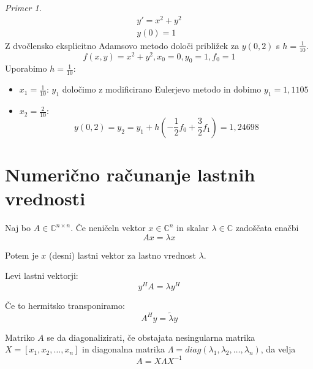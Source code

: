 \documentclass[a4paper,12pt]{article}
\theoremstyle{definition}
\theoremstyle{remark}
\newtheorem*{ex}{Primer}
\newcommand{\C}{\mathbb{C}}
\begin{document}
\begin{ex}
    \begin{gather*}
        y' = x^2 + y^2 \\
        y(0) = 1
    \end{gather*}
    Z dvočlensko eksplicitno Adamsovo metodo določi približek za $y(0, 2)$ s $h = \frac{1}{10}$.
    \begin{equation*}
        f(x, y) = x^2 + y^2, x_0 = 0, y_0 = 1, f_0 = 1
    \end{equation*}
    Uporabimo $h = \frac{1}{10}$:
    \begin{itemize}
        \item[] $x_1 = \frac{1}{10}$: $y_1$ določimo z modificirano Eulerjevo metodo in dobimo $y_1 = 1,1105$
        \item[] $x_2 = \frac{2}{10}$: 
        \begin{equation*}
            y(0, 2) = y_2 = y_1 + h(-\frac{1}{2} f_0 + \frac{3}{2} f_1) = 1,24698
        \end{equation*}
    \end{itemize}
\end{ex}

\newpage
\section{Numerično računanje lastnih vrednosti}

Naj bo $A \in \C^{n \times n}$. Če neničeln vektor $x \in \C^n$ in skalar $\lambda \in \C$ zadoščata enačbi
\begin{equation*}
    Ax = \lambda x
\end{equation*}

Potem je $x$ (desni) lastni vektor za lastno vrednost $\lambda$.

Levi lastni vektorji:
\begin{equation*}
    y^H A = \lambda y^H
\end{equation*}

Če to hermitsko transponiramo:
\begin{equation*}
    A^H y = \tilde{\lambda} y
\end{equation*}

Matriko $A$ se da diagonalizirati, če obstajata nesingularna matrika $X = [x_1, x_2, \dots, x_n]$ in diagonalna matrika $\Lambda = diag(\lambda_1, \lambda_2, \dots, \lambda_n)$,
da velja
\begin{equation*}
    A = X \Lambda X^{-1}
\end{equation*}
\end{document}

